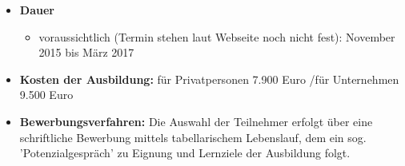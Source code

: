 \documentclass[11pt,a4paper]{article}
\begin{document}
\begin{itemize}
\begin{itemize}
	\item \textbf{Dauer}

		\begin{itemize}
		\item voraussichtlich (Termin stehen laut Webseite noch nicht fest): November 2015 bis März 2017
		\end{itemize}

	\item \textbf{Kosten der Ausbildung:} für Privatpersonen 7.900 Euro /für Unternehmen 9.500 Euro

	\item \textbf{Bewerbungsverfahren:} Die Auswahl der Teilnehmer erfolgt über eine schriftliche Bewerbung mittels tabellarischem Lebenslauf, dem ein sog. 'Potenzialgespräch' zu Eignung und Lernziele der Ausbildung folgt.
	\end{itemize}

\end{itemize}
\end{document}
